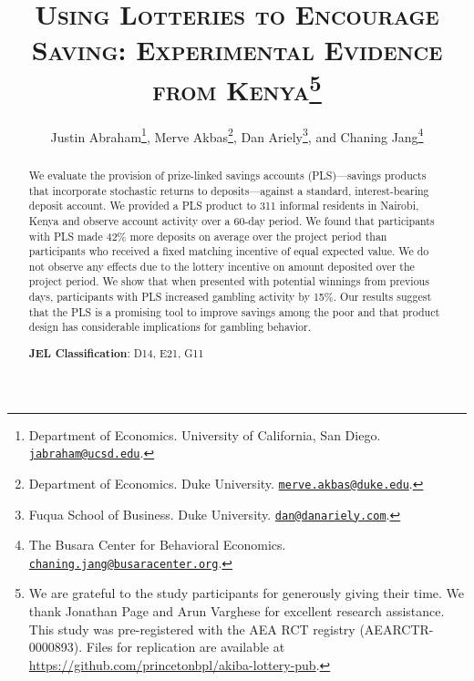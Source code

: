 \documentclass[12pt]{article}
\begin{document}
\title{\textsc{Using Lotteries to Encourage Saving: Experimental Evidence from Kenya}\protect\footnote{We are grateful to the study participants for generously giving their time. We thank Jonathan Page and Arun Varghese for excellent research assistance. This study was pre-registered with the AEA RCT registry (AEARCTR-0000893). Files for replication are available at \url{https://github.com/princetonbpl/akiba-lottery-pub}.}}

\author{Justin Abraham\thanks{Department of Economics. University of California, San Diego. \protect\href{mailto:jabraham@ucsd.edu}{\nolinkurl{jabraham@ucsd.edu}}.}, Merve Akbas\thanks{Department of Economics. Duke University. \protect\href{mailto:merve.akbas@duke.edu}{\nolinkurl{merve.akbas@duke.edu}}.}, Dan Ariely\thanks{Fuqua School of Business. Duke University. \protect\href{mailto:dan@danariely.com}{\nolinkurl{dan@danariely.com}}.}, and Chaning Jang\thanks{The Busara Center for Behavioral Economics. \protect\href{mailto:chaning.jang@busaracenter.org}{\nolinkurl{chaning.jang@busaracenter.org}}.}}

\maketitle

	\begin{abstract}

		We evaluate the provision of prize-linked savings accounts (PLS)---savings products that incorporate stochastic returns to deposits---against a standard, interest-bearing deposit account. We provided a PLS product to 311 informal residents in Nairobi, Kenya and observe account activity over a 60-day period. We found that participants with PLS made 42\% more deposits on average over the project period than participants who received a fixed matching incentive of equal expected value. We do not observe any effects due to the lottery incentive on amount deposited over the project period. We show that when presented with potential winnings from previous days, participants with PLS increased gambling activity by 15\%. Our results suggest that the PLS is a promising tool to improve savings among the poor and that product design has considerable implications for gambling behavior.


		\medskip \noindent
		\textbf{JEL Classification}: D14, E21, G11

	\end{abstract}
\end{document}
